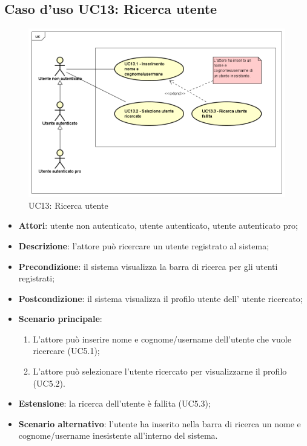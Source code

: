 \newpage
\subsection{Caso d'uso UC13: Ricerca utente}
\label{UC11}
\begin{figure}[h]
	\centering
	\includegraphics[scale=0.5]{UML/UC13.png}
	\caption{UC13: Ricerca utente}
\end{figure}
\FloatBarrier
\begin{itemize}
	\item \textbf{Attori}: utente non autenticato, utente autenticato, utente autenticato pro;
	\item \textbf{Descrizione}: l'attore può ricercare un utente registrato al sistema;
	\item \textbf{Precondizione}: il sistema visualizza la barra di ricerca per gli utenti registrati;
	\item \textbf{Postcondizione}: il sistema visualizza il profilo utente dell' utente ricercato;
	\item \textbf{Scenario principale}:
	\begin{enumerate}
		\item L'attore può inserire nome e cognome/username dell'utente che vuole ricercare (UC5.1);
		\item L'attore può selezionare l'utente ricercato per visualizzarne il profilo (UC5.2).
	\end{enumerate} 
	\item \textbf{Estensione}: la ricerca dell'utente è fallita (UC5.3);
	\item \textbf{Scenario alternativo}: l'utente ha inserito nella barra di ricerca un nome e cognome/username inesistente all'interno del sistema. 
\end{itemize}


